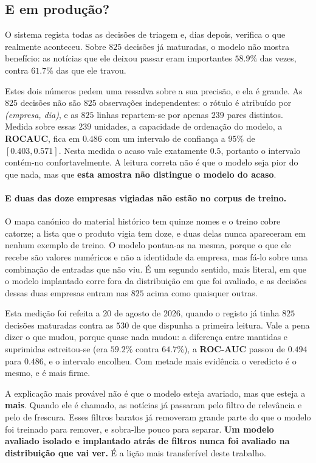 \subsection{E em produção?}

O sistema regista todas as decisões de triagem e, dias depois, verifica o que realmente aconteceu.
Sobre $825$ decisões já maturadas, o modelo não mostra benefício: as notícias que ele deixou passar
eram importantes $58.9\%$ das vezes, contra $61.7\%$ das que ele travou.

Estes dois números pedem uma ressalva sobre a sua precisão, e ela é grande. As $825$ decisões não
são $825$ observações independentes: o rótulo é atribuído por \emph{(empresa, dia)}, e as $825$
linhas repartem-se por apenas $239$ pares distintos. Medida sobre essas $239$ unidades, a capacidade
de ordenação do modelo, a \textbf{\gls{ROCAUC}}, fica em $0.486$ com um intervalo de confiança a
$95\%$ de $[0.403, 0.571]$. Nesta medida o acaso vale exatamente $0.5$, portanto o intervalo
contém-no confortavelmente. A leitura correta não é que o modelo seja pior do que
nada, mas que \textbf{esta amostra não distingue o modelo do acaso}.

\paragraph{E duas das doze empresas vigiadas não estão no corpus de treino.}
O mapa canónico do material histórico tem quinze nomes e o treino cobre catorze; a lista que o
produto vigia tem doze, e duas delas nunca apareceram em nenhum exemplo de treino. O modelo
pontua-as na mesma, porque o que ele recebe são valores numéricos e não a identidade da empresa,
mas fá-lo sobre uma combinação de entradas que não viu. É um segundo sentido, mais literal, em que
o modelo implantado corre fora da distribuição em que foi avaliado, e as decisões dessas duas
empresas entram nas $825$ acima como quaisquer outras.

Esta medição foi refeita a 20 de agosto de 2026, quando o registo já tinha $825$ decisões
maturadas contra as $530$ de que dispunha a primeira leitura. Vale a pena dizer o que mudou,
porque quase nada mudou: a diferença entre mantidas e suprimidas estreitou-se (era $59.2\%$
contra $64.7\%$), a \textbf{ROC-AUC} passou de $0.494$ para $0.486$, e o intervalo encolheu.
Com metade mais evidência o veredicto é o mesmo, e é mais firme.

A explicação mais provável não é que o modelo esteja avariado, mas que esteja a \textbf{mais}.
Quando ele é chamado, as notícias já passaram pelo filtro de relevância e pelo de frescura. Esses
filtros baratos já removeram grande parte do que o modelo foi treinado para remover, e sobra-lhe
pouco para separar. \textbf{Um modelo avaliado isolado e implantado atrás de filtros nunca foi
avaliado na distribuição que vai ver.} É a lição mais transferível deste trabalho.


